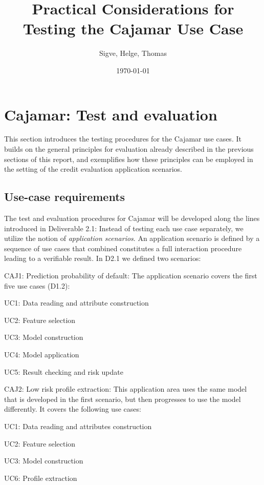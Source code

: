 \documentclass{article}
\title{Practical Considerations for Testing the Cajamar Use Case}
\author{Sigve, Helge, Thomas}
\date{\today}
\theoremstyle{theorem}
\theoremstyle{definition}
\begin{document}
\maketitle


\section{Cajamar: Test and evaluation}

This section introduces the testing procedures for the Cajamar use cases. 
It builds on the general principles for evaluation already described in the previous sections of this report, and exemplifies how these principles can be employed in the setting of the credit evaluation application scenarios. 

\subsection{Use-case requirements}

The test and evaluation procedures for Cajamar will be developed along the lines introduced in Deliverable 2.1: Instead of testing each use case separately, we utilize the notion of {\em application scenarios}. 
An application scenario is defined by a sequence of use cases that combined constitutes a full interaction procedure leading to a verifiable result. In D2.1 we defined two scenarios:

\bde
\item[CAJ1: Prediction probability of default:]
The application scenario covers the first five use cases (D1.2):
\bit 
\item UC1: Data reading and attribute construction
\item UC2: Feature selection
\item UC3: Model construction
\item UC4: Model application
\item UC5: Result checking and risk update
\eit

\item[CAJ2: Low risk profile extraction:] This application area uses the same model that is developed in the first scenario, but then progresses to use the model differently. It covers the following use cases:
\bit 
\item UC1: Data reading and attributes construction
\item UC2: Feature selection
\item UC3: Model construction
\item UC6: Profile extraction
\eit
\ede
\end{document}

